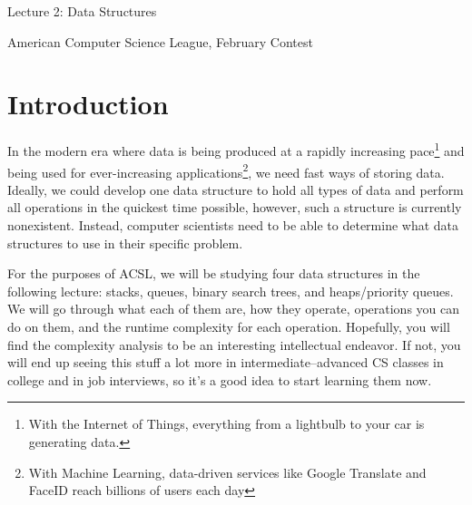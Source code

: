 \documentclass[10pt]{article}
\begin{document}
    \noindent
    \begin{center}

        \hrulefill

        \vspace{5pt}

        \vspace{0pt}

        {\Large \hfill  Lecture 2: Data Structures\hfill}
        \vspace{10pt}

        {\large \hfill  American Computer Science League, February Contest\hfill}
        \vspace{10pt}


        \vspace{-3pt}
        \hrulefill
    \end{center}

\section{Introduction}
In the modern era where data is being produced at a rapidly increasing
pace\footnote{With the Internet of Things, everything from a lightbulb
to your car is generating data.}
and being used for ever-increasing
applications\footnote{With Machine Learning, data-driven services like Google Translate and
FaceID reach billions of users each day},
we need fast ways of storing data.
Ideally, we could develop one data structure to hold all types of data
and perform all operations in the quickest time possible, however,
such a structure is currently nonexistent.
Instead, computer scientists need to be able to determine what
data structures to use in their specific problem.

For the purposes of ACSL, we will be studying four data structures
in the following lecture: stacks, queues, binary search trees, and
heaps/priority queues.
We will go through what each of them are, how they operate,
operations you can do on them, and the runtime complexity for each operation.
Hopefully, you will find the complexity analysis to be an interesting intellectual endeavor.
If not, you will end up seeing this stuff a lot more in intermediate--advanced CS
classes in college and in job interviews, so it's a good idea to start learning them now.
\end{document}
